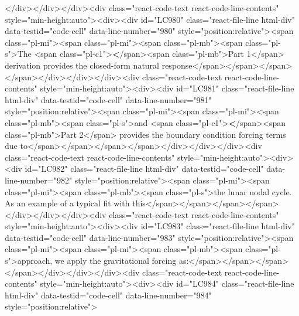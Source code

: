 {{{{{{{{{{</div></div></div><div class="react-code-text react-code-line-contents" style="min-height:auto"><div><div id="LC980" class="react-file-line html-div" data-testid="code-cell" data-line-number="980" style="position:relative"><span class="pl-mi"><span class="pl-mi"><span class="pl-mb"><span class="pl-s">The <span class="pl-c1">\textbf</span>{<span class="pl-mb">Part 1</span>} derivation provides the closed-form natural response</span></span></span></span></div></div></div><div class="react-code-text react-code-line-contents" style="min-height:auto"><div><div id="LC981" class="react-file-line html-div" data-testid="code-cell" data-line-number="981" style="position:relative"><span class="pl-mi"><span class="pl-mi"><span class="pl-mb"><span class="pl-s">and <span class="pl-c1">\textbf</span>{<span class="pl-mb">Part 2</span>} provides the boundary condition forcing terms due to</span></span></span></span></div></div></div><div class="react-code-text react-code-line-contents" style="min-height:auto"><div><div id="LC982" class="react-file-line html-div" data-testid="code-cell" data-line-number="982" style="position:relative"><span class="pl-mi"><span class="pl-mi"><span class="pl-mb"><span class="pl-s">the lunar nodal cycle. As an example of a typical fit with this</span></span></span></span></div></div></div><div class="react-code-text react-code-line-contents" style="min-height:auto"><div><div id="LC983" class="react-file-line html-div" data-testid="code-cell" data-line-number="983" style="position:relative"><span class="pl-mi"><span class="pl-mi"><span class="pl-mb"><span class="pl-s">approach, we apply the gravitational forcing as:</span></span></span></span></div></div></div><div class="react-code-text react-code-line-contents" style="min-height:auto"><div><div id="LC984" class="react-file-line html-div" data-testid="code-cell" data-line-number="984" style="position:relative">
}}}}}}}}}}

